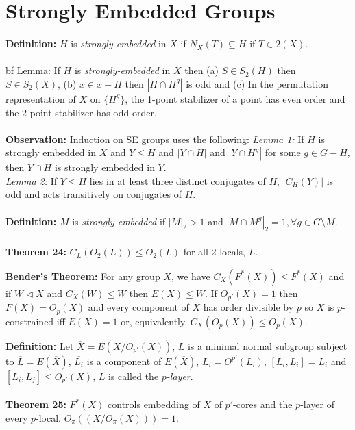 \section {Strongly Embedded Groups}
{\bf Definition:}  $H$ is \emph{strongly-embedded} in $X$ if $N_X(T) \subseteq H$ if $T \in 2(X)$.
\\
\\
{bf Lemma:} If $H$ is \emph{strongly-embedded} in $X$ then (a) $S \in S_2(H)$ then $S \in S_2(X)$, (b)
$x \in x - H$ then $|H \cap H^g|$ is odd and (c) In the permutation representation of $X$ on $\{H^g\}$,
the 1-point stabilizer of a point has even order and the $2$-point stabilizer has odd order.
\\
\\
{\bf Observation:}  Induction on SE groups uses the following:
\emph{Lemma 1:} If $H$ is strongly embedded in $X$ and $Y \leq H$ and $|Y \cap H|$ and $|Y \cap H^g|$ for
some $g \in G - H$, then $Y \cap H$ is strongly embedded in $Y$.
\\
\emph{Lemma 2:} If $Y \leq H$ lies in at least three distinct conjugates of $H$, $|C_H(Y)|$ is odd and
acts transitively on conjugates of $H$.
\\
\\
{\bf Definition:}  $M$ is \emph{strongly-embedded} if
$|M|_2 > 1$ and $|M \cap M^g|_2=1, \forall g \in G \setminus M$.
\\
\\
{\bf Theorem 24:}
$C_L(O_2(L)) \le O_2(L)$ for all
$2$-locals, $L$.
\begin{quote}
\end{quote}
{\bf Bender's Theorem:} For any group $X$, we have $C_X(F^*(X)) \le F^*(X)$ and if
$W \lhd X$ and $C_X(W) \le W$ then $E(X) \le W$.  If $O_{p'}(X)=1$ then
$F(X)=O_p(X)$ and every component of $X$ has order divisible by $p$ so
$X$ is $p$-constrained iff $E(X)=1$ or, equivalently, $C_X(O_p(X)) \le O_p(X)$.
\begin{quote}
\end{quote}
{\bf Definition:}
Let ${\overline X}= E(X/O_{p'}(X))$, $L$ is a minimal normal subgroup subject to ${\overline L}= E({\overline X})$,
${\overline {L_i}}$ is a component of $E({\overline X})$, $L_i= O^{p'}(L_i)$,
$[L_i, L_i]= L_i$ and $[L_i, L_j] \le O_{p'}(X)$, $L$ is called the \emph{ $p$-layer}. \\
\\
{\bf Theorem 25:}
$F^*(X)$ controls embedding of $X$ of
$p'$-cores and the $p$-layer of every $p$-local.  $O_{\pi}((X/O_{\pi}(X)))=1$.
\begin{quote}
\end{quote}
